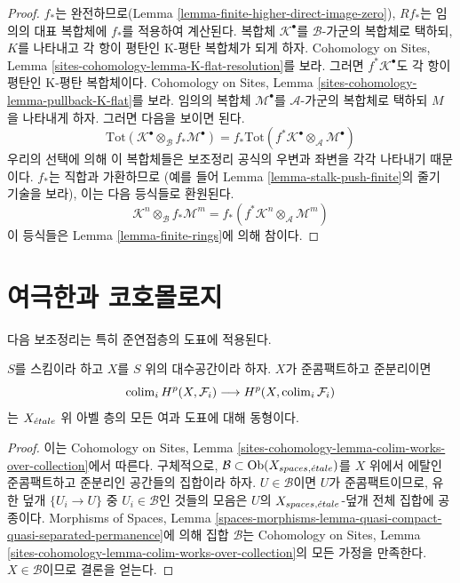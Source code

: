 \begin{proof}
$f_*$는 완전하므로(Lemma
\ref{lemma-finite-higher-direct-image-zero}), $Rf_*$는 임의의 대표
복합체에 $f_*$를 적용하여 계산된다. 복합체
$\mathcal{K}^\bullet$를 $\mathcal{B}$-가군의 복합체로 택하되,
$K$를 나타내고 각 항이 평탄인 K-평탄 복합체가 되게 하자.
Cohomology on Sites, Lemma
\ref{sites-cohomology-lemma-K-flat-resolution}를 보라.
그러면 $f^*\mathcal{K}^\bullet$도 각 항이 평탄인 K-평탄 복합체이다.
Cohomology on Sites, Lemma
\ref{sites-cohomology-lemma-pullback-K-flat}를 보라.
임의의 복합체 $\mathcal{M}^\bullet$를 $\mathcal{A}$-가군의 복합체로
택하되 $M$을 나타내게 하자. 그러면 다음을 보이면 된다.
$$
\text{Tot}(\mathcal{K}^\bullet \otimes_\mathcal{B} f_*\mathcal{M}^\bullet)
=
f_*\text{Tot}(f^*\mathcal{K}^\bullet \otimes_\mathcal{A} \mathcal{M}^\bullet)
$$
우리의 선택에 의해 이 복합체들은 보조정리 공식의 우변과 좌변을
각각 나타내기 때문이다. $f_*$는 직합과 가환하므로
(예를 들어 Lemma \ref{lemma-stalk-push-finite}의 줄기 기술을 보라),
이는 다음 등식들로 환원된다.
$$
\mathcal{K}^n \otimes_\mathcal{B} f_*\mathcal{M}^m
=
f_*(f^*\mathcal{K}^n \otimes_\mathcal{A} \mathcal{M}^m)
$$
이 등식들은 Lemma \ref{lemma-finite-rings}에 의해 참이다.
\end{proof}










\section{여극한과 코호몰로지}
\label{section-colimits}

\noindent
다음 보조정리는 특히 준연접층의 도표에 적용된다.

\begin{lemma}
\label{lemma-colimits}
$S$를 스킴이라 하고 $X$를 $S$ 위의 대수공간이라 하자.
$X$가 준콤팩트하고 준분리이면
$$
\mathop{\mathrm{colim}}\nolimits_i H^p(X, \mathcal{F}_i)
\longrightarrow
H^p(X, \mathop{\mathrm{colim}}\nolimits_i \mathcal{F}_i)
$$
는 $X_{\acute{e}tale}$ 위 아벨 층의 모든 여과 도표에 대해 동형이다.
\end{lemma}

\begin{proof}
이는 Cohomology on Sites, Lemma
\ref{sites-cohomology-lemma-colim-works-over-collection}에서 따른다.
구체적으로, $\mathcal{B} \subset \mathop{\mathrm{Ob}}\nolimits(X_{spaces, {\acute{e}tale}})$를
$X$ 위에서 에탈인 준콤팩트하고 준분리인 공간들의 집합이라 하자.
$U \in \mathcal{B}$이면 $U$가 준콤팩트이므로,
유한 덮개 $\{U_i \to U\}$ 중 $U_i \in \mathcal{B}$인 것들의 모음은
$U$의 $X_{spaces, {\acute{e}tale}}$-덮개 전체 집합에 공종이다.
Morphisms of Spaces, Lemma
\ref{spaces-morphisms-lemma-quasi-compact-quasi-separated-permanence}에 의해
집합 $\mathcal{B}$는 Cohomology on Sites, Lemma
\ref{sites-cohomology-lemma-colim-works-over-collection}의 모든 가정을
만족한다. $X \in \mathcal{B}$이므로 결론을 얻는다.
\end{proof}

